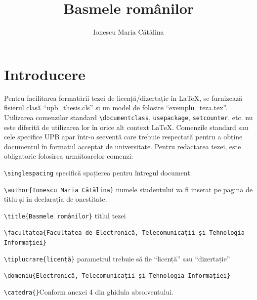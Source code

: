 \documentclass[12pt, a4paper, oneside, romanian]{teza-upb}
\begin{document}
\author{Ionescu Maria Cătălina}

\title{Basmele românilor}




\beforepreface
\listoffigures
\listoftables
{}
\afterpreface 

\chapter{Introducere}


   Pentru facilitarea formatării tezei de licență/dizertație în
   \LaTeX{}, se furnizează fișierul clasă ``upb\_thesis.cls'' și un model de
   folosire ``exemplu\_teza.tex''.  Utilizarea comenzilor standard
   \verb=\documentclass=, \verb=usepackage=, \verb=setcounter=,
   etc. nu este diferită de utilizarea lor în orice alt context
   \LaTeX{}. Comenzile standard sau cele specifice {UPB}
   apar într-o secvență care trebuie respectată pentru a obține documentul în formatul
   acceptat de universitate.  Pentru redactarea tezei, este
   obligatorie folosirea următoarelor comenzi:

\verb=\singlespacing= specifică spațierea pentru întregul document.

\verb=\author{Ionescu Maria Cătălina}= numele studentului va fi inserat pe pagina de titlu și în declarația de onestitate.  

\verb=\title{Basmele românilor}= titlul tezei 

\verb=\facultatea{Facultatea de Electronică, Telecomunicații și Tehnologia= \\
\verb=Informației}=

\verb=\tiplucrare{licență}= parametrul trebuie să fie ``licență'' sau ``dizertație''

\verb=\domeniu{Electronică, Telecomunicații și Tehnologia Informației}=

\verb=\catedra{}=Conform anexei 4 din ghidula absolventului. 
\end{document}
